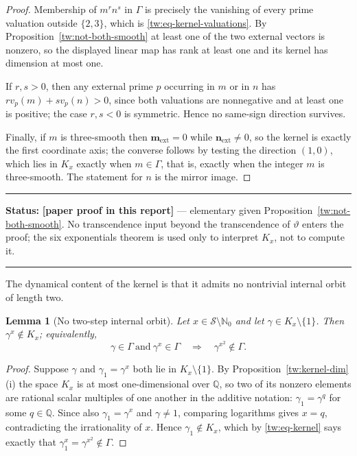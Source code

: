 \documentclass[11pt,oneside]{article}
\newtheorem{lemma}[theorem]{Lemma}
\theoremstyle{definition}
\theoremstyle{remark}
\newcommand{\Nzero}{\mathbb N_0}
\newcommand{\Q}{\mathbb Q}
\newcommand{\thetaq}{\vartheta}
\newcommand{\Sol}{\mathcal S}
\newcommand{\vpp}[2]{v_{#1}\!\left(#2\right)}
\newcommand{\GammaSat}{\Gamma}
\newcommand{\statusnew}{\textcolor{newgreen}{\textbf{[paper proof in this report]}}}
\newenvironment{statusbox}[1]
{\begin{center}\begin{minipage}{0.94\textwidth}\raggedright\hbadness=10000\hrule
\vspace{0.45em}\textbf{Status:} #1\par\vspace{0.35em}}
{\vspace{0.35em}\hrule\end{minipage}\end{center}}
\begin{document}
\begin{proof}
Membership of $m^rn^s$ in $\GammaSat$ is precisely the vanishing of every prime valuation
outside $\{2,3\}$, which is \eqref{tw:eq-kernel-valuations}.  By
Proposition~\ref{tw:not-both-smooth} at least one of the two external vectors is nonzero, so
the displayed linear map has rank at least one and its kernel has dimension at most one.

If $r,s>0$, then any external prime $p$ occurring in $m$ or in $n$ has
$r\vpp{p}{m}+s\vpp{p}{n}>0$, since both valuations are nonnegative and at least one is
positive; the case $r,s<0$ is symmetric.  Hence no same-sign direction survives.

Finally, if $m$ is three-smooth then $\mathbf m_{\mathrm{ext}}=0$ while
$\mathbf n_{\mathrm{ext}}\ne0$, so the kernel is exactly the first coordinate axis; the
converse follows by testing the direction $(1,0)$, which lies in $K_x$ exactly when
$m\in\GammaSat$, that is, exactly when the integer $m$ is three-smooth.  The statement for
$n$ is the mirror image.
\end{proof}

\begin{statusbox}{\statusnew{} --- elementary given Proposition~\ref{tw:not-both-smooth}.  No
transcendence input beyond the transcendence of $\thetaq$ enters the proof; the six
exponentials theorem is used only to interpret $K_x$, not to compute it.}
\end{statusbox}

The dynamical content of the kernel is that it admits no nontrivial internal orbit of length
two.

\begin{lemma}[No two-step internal orbit]
\label{tw:no-two-step}
Let $x\in\Sol\setminus\Nzero$ and let $\gamma\in K_x\setminus\{1\}$.  Then
$\gamma^x\notin K_x$; equivalently,
\[
 \gamma\in\GammaSat\ \text{and}\ \gamma^x\in\GammaSat
 \quad\Longrightarrow\quad
 \gamma^{x^2}\notin\GammaSat .
\]
\end{lemma}

\begin{proof}
Suppose $\gamma$ and $\gamma_1=\gamma^x$ both lie in $K_x\setminus\{1\}$.  By
Proposition~\ref{tw:kernel-dim}(i) the space $K_x$ is at most one-dimensional over $\Q$, so
two of its nonzero elements are rational scalar multiples of one another in the additive
notation: $\gamma_1=\gamma^q$ for some $q\in\Q$.  Since also $\gamma_1=\gamma^x$ and
$\gamma\ne1$, comparing logarithms gives $x=q$, contradicting the irrationality of $x$.
Hence $\gamma_1\notin K_x$, which by \eqref{tw:eq-kernel} says exactly that
$\gamma_1^x=\gamma^{x^2}\notin\GammaSat$.
\end{proof}
\end{document}
